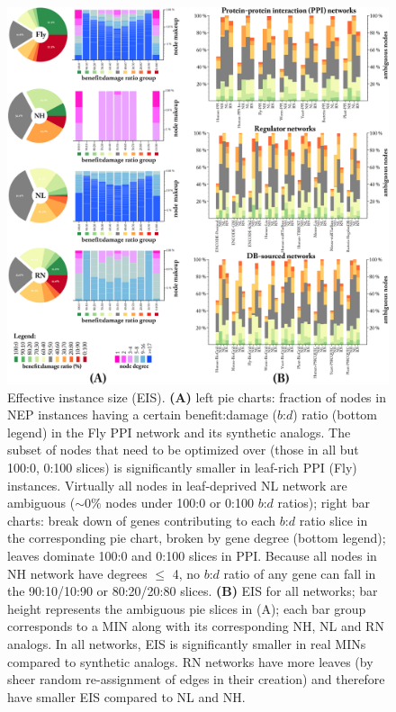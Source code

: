 \documentclass[12pt]{article}
\begin{document}
\begin{figure}[H]%
    \includegraphics[width=\textwidth]{Figure5.png}
    \caption{
                Effective instance size (EIS). \textbf{(A)} left pie charts: fraction of nodes in NEP instances having a certain benefit:damage ($b$:$d$) ratio (bottom legend) in the Fly PPI network and its synthetic analogs. The subset of nodes that need to be optimized over (those in all but 100:0, 0:100 slices) is significantly smaller in leaf-rich PPI (Fly) instances. Virtually all nodes in leaf-deprived NL network are ambiguous (${\sim}0\%$ nodes under 100:0 or 0:100 $b$:$d$ ratios); right bar charts: break down of genes contributing to each $b$:$d$ ratio slice in the corresponding pie chart, broken by gene degree (bottom legend); leaves dominate 100:0 and 0:100 slices in PPI. Because all nodes in NH network have degrees  $\leq$ 4, no $b$:$d$ ratio of any gene can fall in the 90:10/10:90 or 80:20/20:80  slices. \textbf{(B)} EIS for all networks; bar height represents the ambiguous pie slices in (A); each bar group corresponds to a MIN along with its corresponding NH, NL and RN analogs. In all networks, EIS is significantly smaller in real MINs  compared to synthetic analogs. RN networks have more leaves (by sheer random re-assignment of edges in their creation) and therefore have  smaller EIS compared to NL and NH.
             }\label{wheel}
\end{figure}
\end{document}
